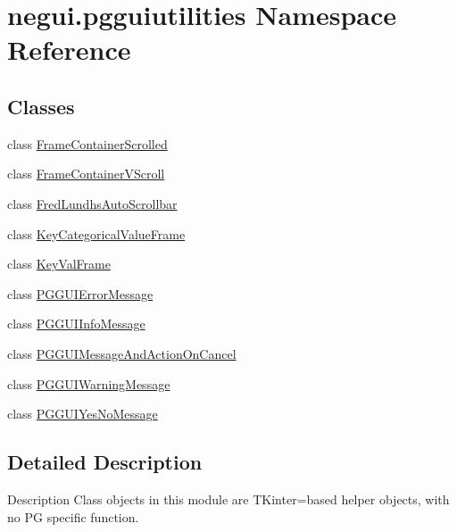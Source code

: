 \hypertarget{namespacenegui_1_1pgguiutilities}{}\section{negui.\+pgguiutilities Namespace Reference}
\label{namespacenegui_1_1pgguiutilities}
\subsection*{Classes}
\begin{DoxyCompactItemize}
\item 
class \hyperlink{classnegui_1_1pgguiutilities_1_1FrameContainerScrolled}{Frame\+Container\+Scrolled}
\item 
class \hyperlink{classnegui_1_1pgguiutilities_1_1FrameContainerVScroll}{Frame\+Container\+V\+Scroll}
\item 
class \hyperlink{classnegui_1_1pgguiutilities_1_1FredLundhsAutoScrollbar}{Fred\+Lundhs\+Auto\+Scrollbar}
\item 
class \hyperlink{classnegui_1_1pgguiutilities_1_1KeyCategoricalValueFrame}{Key\+Categorical\+Value\+Frame}
\item 
class \hyperlink{classnegui_1_1pgguiutilities_1_1KeyValFrame}{Key\+Val\+Frame}
\item 
class \hyperlink{classnegui_1_1pgguiutilities_1_1PGGUIErrorMessage}{P\+G\+G\+U\+I\+Error\+Message}
\item 
class \hyperlink{classnegui_1_1pgguiutilities_1_1PGGUIInfoMessage}{P\+G\+G\+U\+I\+Info\+Message}
\item 
class \hyperlink{classnegui_1_1pgguiutilities_1_1PGGUIMessageAndActionOnCancel}{P\+G\+G\+U\+I\+Message\+And\+Action\+On\+Cancel}
\item 
class \hyperlink{classnegui_1_1pgguiutilities_1_1PGGUIWarningMessage}{P\+G\+G\+U\+I\+Warning\+Message}
\item 
class \hyperlink{classnegui_1_1pgguiutilities_1_1PGGUIYesNoMessage}{P\+G\+G\+U\+I\+Yes\+No\+Message}
\end{DoxyCompactItemize}


\subsection{Detailed Description}
\begin{DoxyVerb}Description
Class objects in this module are TKinter=based
helper objects, with no PG specific function.\end{DoxyVerb}
 